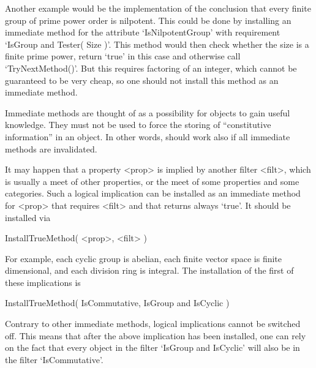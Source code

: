 Another example would be the implementation of the conclusion that
every finite group of prime power order is nilpotent.
This could be done by installing an immediate method for the attribute
`IsNilpotentGroup' with requirement `IsGroup and Tester( Size )'.
This method would then check whether the size is a finite prime power,
return `true' in this case and otherwise call `TryNextMethod()'.
But this requires factoring of an integer,
which cannot be guaranteed to be very cheap,
so one should not install this method as an immediate method.

Immediate methods are thought of as a possibility for objects to gain
useful knowledge.
They must not be used to force the storing of ``constitutive
information'' in an object.
In other words, {\GAP} should work also if all immediate methods are
invalidated.


It may happen that a property <prop> is implied by another filter <filt>,
which is usually a meet of other properties,
or the meet of some properties and some categories.
Such a logical implication can be installed as an immediate method for
<prop> that requires <filt> and that returns always `true'.
It should be installed via

\>InstallTrueMethod( <prop>, <filt> )

For example, each cyclic group is abelian,
each finite vector space is finite dimensional,
and each division ring is integral.
The installation of the first of these implications is

\>InstallTrueMethod( IsCommutative, IsGroup and IsCyclic )

Contrary to other immediate methods,
logical implications cannot be switched off.
This means that after the above implication has been installed,
one can rely on the fact that every object in the filter
`IsGroup and IsCyclic' will also be in the filter `IsCommutative'.


